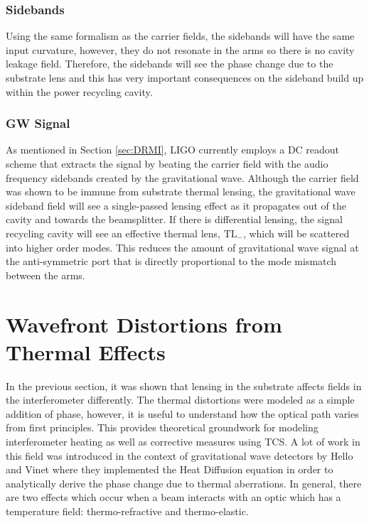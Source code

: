		\subsubsection{Sidebands}
		Using the same formalism as the carrier fields, the sidebands will have the same input curvature, however, they do not resonate in the arms so there is no cavity leakage field.  Therefore, the sidebands will see the phase change due to the substrate lens and this has very important consequences on the sideband build up within the power recycling cavity.
		\subsubsection{GW Signal}
		As mentioned in Section \ref{sec:DRMI}, LIGO currently employs a DC readout scheme that extracts the signal by beating the carrier field with the audio frequency sidebands created by the gravitational wave.  Although the carrier field was shown to be immune from substrate thermal lensing, the gravitational wave sideband field will see a single-passed lensing effect as it propagates out of the cavity and towards the beamsplitter.  If there is differential lensing, the signal recycling cavity will see an effective thermal lens, $\text{TL}_{-}$, which will be scattered into higher order modes.  This reduces the amount of gravitational wave signal at the anti-symmetric port that is directly proportional to the mode mismatch between the arms.
		
	\section{Wavefront Distortions from Thermal Effects}\label{sec:wf_dist}
	In the previous section, it was shown that lensing in the substrate affects fields in the interferometer differently.  The thermal distortions were modeled as a simple addition of phase, however, it is useful to understand how the optical path varies from first principles.  This provides theoretical groundwork for modeling interferometer heating as well as corrective measures using TCS.  A lot of work in this field was introduced in the context of gravitational wave detectors by Hello and Vinet \cite{hello_vinet} \cite{Vinet_Thermal_Issues} where they implemented the Heat Diffusion equation in order to analytically derive the phase change due to thermal aberrations.  In general, there are two effects which occur when a beam interacts with an optic which has a temperature field: thermo-refractive and thermo-elastic.  
	
